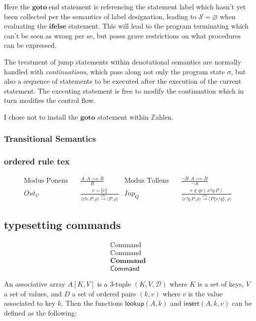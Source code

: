 \documentclass{article}
\begin{document}
	Here the $\mathbf{goto} \ \text{end}$ statement is referencing the statement label  which hasn't yet been collected per the semantics of label designation, leading to $\mathcal{S} = \varnothing$ when evaluating the $\mathbf{ifelse}$ statement. This will lead to the program terminating which can't be seen as wrong per se, but poses grave restrictions on what procedures can be expressed.
	
	The treatment of jump statements within denotational semantics are normally handled with \emph{continuations}, which pass along not only the program state $\sigma$, but also a sequence of statements to be executed after the execution of the current statement. The executing statement is free to modify the continuation which in turn modifies the control flow.
	
	I chose not to install the $\mathbf{goto}$ statement within $\mathbb{Z}$ahlen.
	
	\subsubsection{Transitional Semantics}
	
	\subsubsection{ordered rule tex}
	
	\begin{align*}
		\text{Modus Ponens} & \quad \frac{A \ \ A \implies B}{B} 
		&  \text{Modus Tollens} & \quad \frac{\neg B \ \ A \implies B}{\neg A} \\
		Out_{C} & \quad\frac{v = \llbracket e\rrbracket}{\langle c!e.P,\rho\rangle\xrightarrow{e!v}\langle P,\rho\rangle} & Inp_{Q} & \quad\frac{r\not\in qv(x?q.P)}{\langle c?q.P,\rho\rangle\xrightarrow{c?r}\langle P\{r/q\},\rho\rangle}
	\end{align*}
	
	\subsection{typesetting commands}
	
	\begin{align*}
		\text{Command} \\
		\mathrm{Command} \\
		\mathbf{Command} \\
		\mathsf{Command}
	\end{align*}
	
	An associative array $A[K, V]$ is a 3-tuple $(K, V, \mathcal{D})$ where $K$ is a set of keys, $V$ a set of values, and $D$ a set of ordered pairs $(k, v)$ where $v$ is the value associated to key $k$. Then the functions $\mathsf{lookup}(A, k)$ and $\mathsf{insert}(A, k, v)$ can be defined as the following:
	
\end{document}
